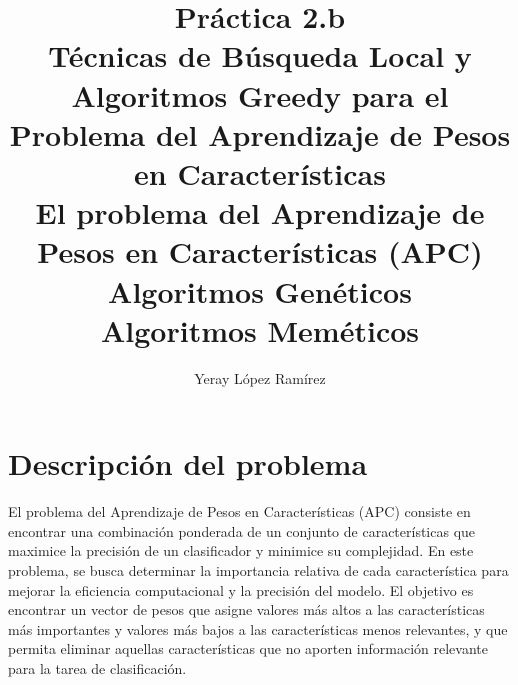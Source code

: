 

\title{
	Práctica 2.b \\\vspace{1cm}
	Técnicas de Búsqueda Local y Algoritmos Greedy
	para el Problema del Aprendizaje de Pesos en
	Características \vspace{1cm} \\
	El problema del Aprendizaje de Pesos en Características (APC)	\vspace{1cm} \\
	Algoritmos Genéticos \\
	Algoritmos Meméticos \hspace{1cm} 
 }   

\author{Yeray López Ramírez	}                             

\renewcommand*\contentsname{hola}

\makeatletter
\let\thetitle\@title
\let\theauthor\@author
\let\thedate\@date
\makeatother





\newpage %
\newcommand{\code}[1]{\colorbox{light-gray}{\textcolor{alizarin}{\texttt{#1}}}}
\newcommand{\high}[1]{\colorbox{light-gray}{\textcolor{nyellow}{\texttt{#1}}}}

\tableofcontents %

\listoffigures

\listoftables

\newpage


\section{Descripción del problema}
El problema del Aprendizaje de Pesos en Características (APC) consiste en encontrar una combinación ponderada de un conjunto de características que maximice la precisión de un clasificador y minimice su complejidad. En este problema, se busca determinar la importancia relativa de cada característica para mejorar la eficiencia computacional y la precisión del modelo. El objetivo es encontrar un vector de pesos que asigne valores más altos a las características más importantes y valores más bajos a las características menos relevantes, y que permita eliminar aquellas características que no aporten información relevante para la tarea de clasificación. \\

